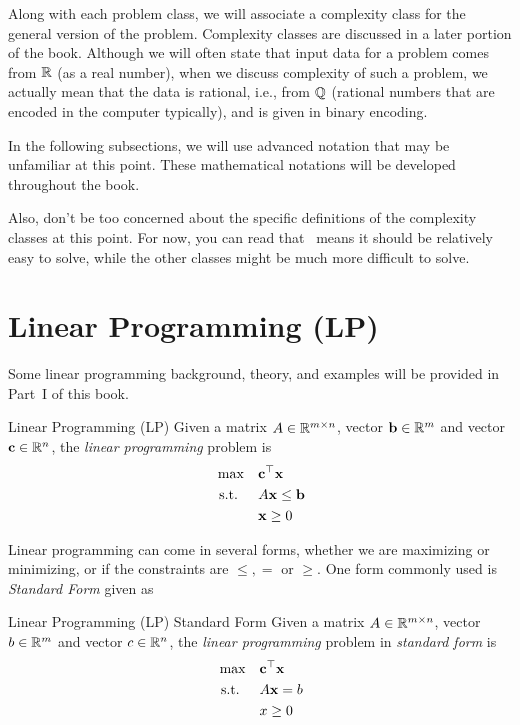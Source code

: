 Along with each problem class, we will associate a complexity class for the general version of the problem.  Complexity classes are discussed in a later portion of the book.  Although we will often state that input data for a problem comes from $\mathbb{R}$ (as a real number), when we discuss complexity of such a problem, we actually mean that the data is rational, i.e., from $\mathbb{Q}$ (rational numbers that are encoded in the computer typically), and is given in binary encoding.

\begin{warn}
In the following subsections, we will use advanced notation that may be unfamiliar at this point.  These mathematical notations will be developed throughout the book.

Also, don't be too concerned about the specific definitions of the complexity classes at this point.  For now, you can read that \polynomial\ means it should be relatively easy to solve, while the other classes might be much more difficult to solve.
\end{warn}

\section{Linear Programming (LP)}
\label{sec:intro-LP}

Some linear programming background, theory, and examples will be provided in Part~I of this book.
\begin{general}{Linear Programming (LP)}{\polynomial}
\label{general:LP}
Given a matrix $A \in \mathbb{R}^{m\times n}$, vector $\mathbf{b} \in \mathbb{R}^m$ and vector $\mathbf{c} \in \mathbb{R}^n$, the \emph{linear programming} problem is
\begin{equation}
\label{eq:LP}
\begin{split}
\max \quad & \mathbf{c}^\top \mathbf{x}\\
\text{ s.t. }  \quad & A\mathbf{x} \leq \mathbf{b}\\
& \mathbf{x} \geq 0
\end{split}
\end{equation}
\end{general}

Linear programming can come in several forms, whether we are maximizing or minimizing, or if the constraints are $\leq, =$ or $\geq$.   One form commonly used is \emph{Standard Form} given as 
\begin{general}{Linear Programming (LP) Standard Form}{\polynomial}
Given a matrix $A \in \mathbb{R}^{m\times n}$, vector $b \in \mathbb{R}^m$ and vector $c \in \mathbb{R}^n$, the \emph{linear programming} problem in \emph{standard form} is
\begin{equation}
\label{eq:standardLP}
\begin{split}
\max \quad & \mathbf{c}^\top \mathbf{x}\\
\text{ s.t. }  \quad & A\mathbf{x} = b\\
& x \geq 0
\end{split}
\end{equation}
\end{general}

